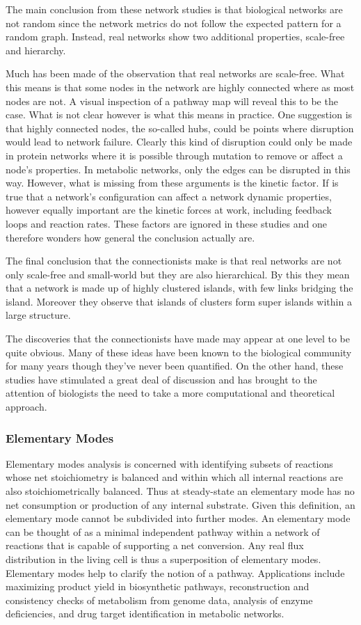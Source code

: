 The main conclusion from these network studies is that biological
networks are not random since the network metrics do not follow
the expected pattern for a random graph. Instead, real networks
show two additional properties, scale-free and hierarchy.

Much has been made of the observation that real networks are
scale-free. What this means is that some nodes in the network are
highly connected where as most nodes are not. A visual inspection
of a pathway map will reveal this to be the case. What is not
clear however is what this means in practice. One suggestion is
that highly connected nodes, the so-called hubs, could be points
where disruption would lead to network failure. Clearly this kind
of disruption could only be made in protein networks where it is
possible through mutation to remove or affect a node's properties.
In metabolic networks, only the edges can be disrupted in this
way. However, what is missing from these arguments is the kinetic
factor. If is true that a network's configuration can affect a
network dynamic properties, however equally important are the
kinetic forces at work, including feedback loops and reaction
rates. These factors are ignored in these studies and one
therefore wonders how general the conclusion actually are.

The final conclusion that the connectionists make is that real
networks are not only scale-free and small-world but they are also
hierarchical. By this they mean that a network is made up of
highly clustered islands, with few links bridging the island.
Moreover they observe that islands of clusters form super
islands within a large structure.

The discoveries that the connectionists have made may appear at
one level to be quite obvious. Many of these ideas have been known
to the biological community for many years though they've never
been quantified. On the other hand, these studies have stimulated
a great deal of discussion and has brought to the attention of
biologists the need to take a more computational and theoretical
approach.


\subsubsection{Elementary Modes}

Elementary modes analysis is concerned with identifying subsets of
reactions whose net stoichiometry is balanced and within which all
internal reactions are also stoichiometrically balanced. Thus at
steady-state an elementary mode has no net consumption or
production of any internal substrate. Given this definition, an
elementary mode cannot be subdivided into further modes. An
elementary mode can be thought of as a minimal independent pathway
within a network of reactions that is capable of supporting a net
conversion. Any real flux distribution in the living cell is thus
a superposition of elementary modes. Elementary modes help to
clarify the notion of a pathway. Applications include maximizing
product yield in biosynthetic pathways, reconstruction and
consistency checks of metabolism from genome data, analysis of
enzyme deficiencies, and drug target identification in metabolic
networks.

